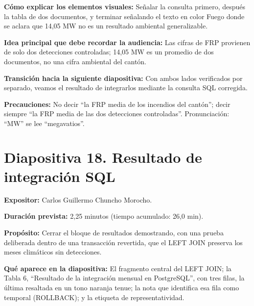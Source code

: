 \documentclass[11pt,a4paper]{article}
\newcommand{\campo}[2]{\par\medskip\noindent\textbf{#1:} #2\par}
\newcommand{\separadordiapositiva}{\bigskip\noindent{\color{Tierra!60}\hrulefill}\bigskip}
\begin{document}
\campo{C\'omo explicar los elementos visuales}{Se\~nalar la consulta
primero, despu\'es la tabla de dos documentos, y terminar se\~nalando el
texto en color Fuego donde se aclara que 14,05 MW no es un resultado
ambiental generalizable.}
\campo{Idea principal que debe recordar la audiencia}{Las cifras de FRP
provienen de solo dos detecciones controladas; 14,05 MW es un
promedio de dos documentos, no una cifra ambiental del cant\'on.}
\campo{Transici\'on hacia la siguiente diapositiva}{Con ambos lados
verificados por separado, veamos el resultado de integrarlos mediante
la consulta SQL corregida.}
\campo{Precauciones}{No decir ``la FRP media de los incendios del
cant\'on''; decir siempre ``la FRP media de las dos detecciones
controladas''. Pronunciaci\'on: ``MW'' se lee ``megavatios''.}

\separadordiapositiva

\section*{Diapositiva 18. Resultado de integraci\'on SQL}

\campo{Expositor}{Carlos Guillermo Chuncho Morocho.}
\campo{Duraci\'on prevista}{2,25 minutos (tiempo acumulado: 26,0 min).}
\campo{Prop\'osito}{Cerrar el bloque de resultados demostrando, con una
prueba deliberada dentro de una transacci\'on revertida, que el LEFT
JOIN preserva los meses clim\'aticos sin detecciones.}
\campo{Qu\'e aparece en la diapositiva}{El fragmento central del LEFT
JOIN; la Tabla 6, ``Resultado de la integraci\'on mensual en
PostgreSQL'', con tres filas, la \'ultima resaltada en un tono naranja
tenue; la nota que identifica esa fila como temporal (ROLLBACK); y la
etiqueta de representatividad.}
\end{document}
